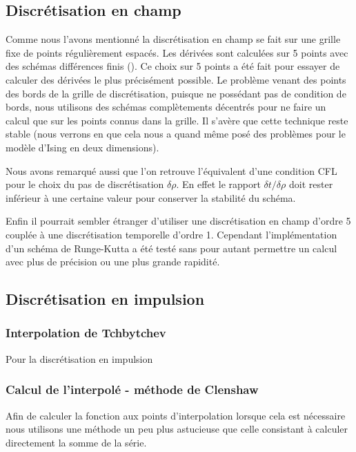 \documentclass[10pt]{article}
\begin{document}
\begin{multicols}{2}
\subsection{Discrétisation en champ}

Comme nous l'avons mentionné la discrétisation en champ se fait sur une grille fixe de points régulièrement espacés. Les dérivées sont calculées sur 5 points avec des schémas différences finis (). Ce choix sur 5 points  a été fait pour essayer de calculer des dérivées le plus précisément possible. Le problème venant des points des bords de la grille de discrétisation, puisque ne possédant pas de condition de bords, nous utilisons des schémas complètements décentrés pour ne faire un calcul que sur les points connus dans la grille. Il s'avère que cette technique reste stable (nous verrons en  que cela nous a quand même posé des problèmes pour le modèle d'Ising en deux dimensions). 

Nous avons remarqué aussi que l'on retrouve l'équivalent d'une condition CFL pour le choix du pas de discrétisation $\delta \rho$. En effet le rapport $\delta t / \delta\rho$ doit rester inférieur à une certaine valeur pour conserver la stabilité du schéma.

Enfin il pourrait sembler étranger d'utiliser une discrétisation en champ d'ordre 5 couplée à une discrétisation temporelle d'ordre 1. Cependant l'implémentation d'un schéma de Runge-Kutta a été testé sans pour autant permettre un calcul avec plus de précision ou une plus grande rapidité. 

\subsection{Discrétisation en impulsion}
\subsubsection{Interpolation de Tchbytchev}

Pour la discrétisation en impulsion 


\subsubsection{Calcul de l'interpolé - méthode de Clenshaw}


Afin de calculer la fonction aux points d'interpolation lorsque cela est nécessaire nous utilisons une méthode un peu plus astucieuse que celle consistant à calculer directement la somme de la série.


\end{multicols}
\end{document}
